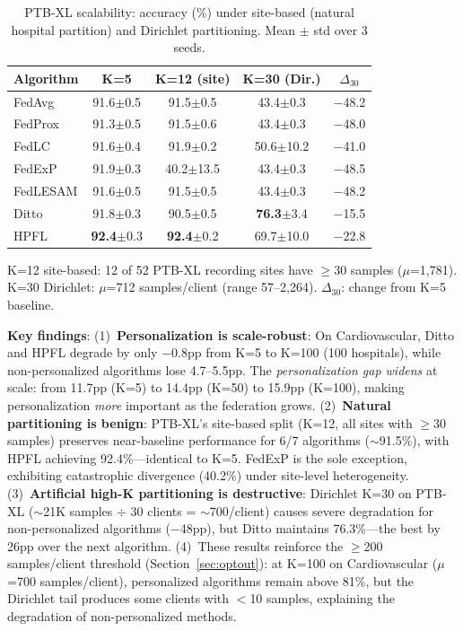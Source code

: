\documentclass[conference]{IEEEtran}
\begin{document}
\begin{table}[htbp]
\centering
\caption{PTB-XL scalability: accuracy (\%) under site-based (natural hospital partition) and Dirichlet partitioning. Mean $\pm$ std over 3 seeds.}
\label{tab:px_scalability}
\small
\begin{tabular}{lcccc}
\toprule
\textbf{Algorithm} & \textbf{K=5} & \textbf{K=12 (site)} & \textbf{K=30 (Dir.)} & \textbf{$\Delta_{30}$} \\
\midrule
FedAvg & 91.6{\tiny$\pm$0.5} & 91.5{\tiny$\pm$0.5} & 43.4{\tiny$\pm$0.3} & $-$48.2 \\
FedProx & 91.3{\tiny$\pm$0.5} & 91.5{\tiny$\pm$0.6} & 43.4{\tiny$\pm$0.3} & $-$48.0 \\
FedLC & 91.6{\tiny$\pm$0.4} & 91.9{\tiny$\pm$0.2} & 50.6{\tiny$\pm$10.2} & $-$41.0 \\
FedExP & 91.9{\tiny$\pm$0.3} & 40.2{\tiny$\pm$13.5} & 43.4{\tiny$\pm$0.3} & $-$48.5 \\
FedLESAM & 91.6{\tiny$\pm$0.5} & 91.5{\tiny$\pm$0.5} & 43.4{\tiny$\pm$0.3} & $-$48.2 \\
\midrule
Ditto & 91.8{\tiny$\pm$0.3} & 90.5{\tiny$\pm$0.5} & \textbf{76.3}{\tiny$\pm$3.4} & $-$15.5 \\
HPFL & \textbf{92.4}{\tiny$\pm$0.3} & \textbf{92.4}{\tiny$\pm$0.2} & 69.7{\tiny$\pm$10.0} & $-$22.8 \\
\bottomrule
\end{tabular}

\vspace{1mm}
\footnotesize{K=12 site-based: 12 of 52 PTB-XL recording sites have $\geq$30 samples ($\mu$=1,781). K=30 Dirichlet: $\mu$=712 samples/client (range 57--2,264). $\Delta_{30}$: change from K=5 baseline.}
\end{table}

\textbf{Key findings}: (1)~\textbf{Personalization is scale-robust}: On Cardiovascular, Ditto and HPFL degrade by only $-$0.8pp from K=5 to K=100 (100 hospitals), while non-personalized algorithms lose 4.7--5.5pp. The \textit{personalization gap widens} at scale: from 11.7pp (K=5) to 14.4pp (K=50) to 15.9pp (K=100), making personalization \textit{more} important as the federation grows.
(2)~\textbf{Natural partitioning is benign}: PTB-XL's site-based split (K=12, all sites with $\geq$30 samples) preserves near-baseline performance for 6/7 algorithms ($\sim$91.5\%), with HPFL achieving 92.4\%---identical to K=5. FedExP is the sole exception, exhibiting catastrophic divergence (40.2\%) under site-level heterogeneity.
(3)~\textbf{Artificial high-K partitioning is destructive}: Dirichlet K=30 on PTB-XL ($\sim$21K samples $\div$ 30 clients = $\sim$700/client) causes severe degradation for non-personalized algorithms ($-$48pp), but Ditto maintains 76.3\%---the best by 26pp over the next algorithm.
(4)~These results reinforce the $\geq$200 samples/client threshold (Section~\ref{sec:optout}): at K=100 on Cardiovascular ($\mu$=700 samples/client), personalized algorithms remain above 81\%, but the Dirichlet tail produces some clients with $<$10 samples, explaining the degradation of non-personalized methods.
\end{document}
